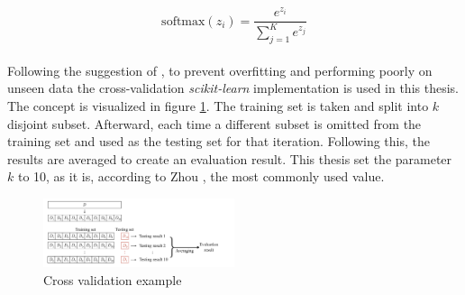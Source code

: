 \begin{equation}\label{softmax}
    \text{softmax}(z_i) = \frac{e^{z_i}}{\sum_{j=1}^{K} e^{z_j}}
\end{equation}
\\
Following the suggestion of \parencite{CrossVal0:online}, to prevent overfitting and performing poorly on unseen data the cross-validation \textit{scikit-learn} implementation \parencite{sklearnl39:online} is used in this thesis. The concept is visualized in figure \ref{fig:crossval}. The training set is taken and split into $k$ disjoint subset. Afterward, each time a different subset is omitted from the training set and used as the testing set for that iteration. Following this, the results are averaged to create an evaluation result. This thesis set the parameter $k$ to 10, as it is, according to Zhou \parencite{zhou2021machine}, the most commonly used value.

\begin{figure}[h]
      \centering
      \includegraphics[width=0.5\textwidth]{images/crossvalidation.png}
      \caption{Cross validation example \parencite{zhou2021machine} }
      \label{fig:crossval}
  \end{figure}

